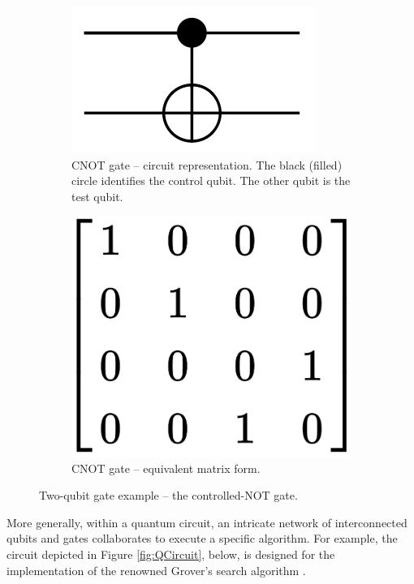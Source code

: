 \begin{figure}[htbp]
  \centering
  \begin{subfigure}[t]{0.45\textwidth}
      \centering
      \includegraphics[width=.75\textwidth]{Figures/Diagrams/CNOT_Gate.png}
      \caption{CNOT gate – circuit representation. The black (filled) circle identifies the control qubit. The other qubit is the test qubit.}
      \label{fig:CNOT_Gate}
  \end{subfigure}
  \hfill
  \begin{subfigure}[t]{0.45\textwidth}
      \centering
      \includegraphics[width=.50\textwidth]{Figures/Diagrams/CNOT_Matrix.png}
      \caption{CNOT gate – equivalent matrix form.}
      \label{fig:CNOT_Matrix}
  \end{subfigure}
  \caption{Two-qubit gate example – the controlled-NOT gate.}
  \label{fig:CNOT}
\end{figure}

More generally, within a quantum circuit, an intricate network of interconnected qubits and gates collaborates to execute a specific algorithm. For example, the circuit depicted in Figure \ref{fig:QCircuit}, below, is designed for the implementation of the renowned Grover's search algorithm \cite{Grover}.


